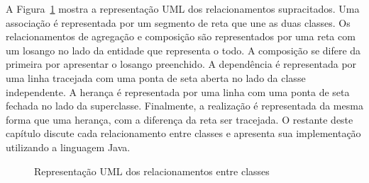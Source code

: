 A Figura~\ref{fig:relacionamentos-uml} mostra a representação UML dos relacionamentos supracitados. Uma associação é representada por um segmento de reta que une as duas classes. Os relacionamentos de agregação e composição são representados por uma reta com um losango no lado da entidade que representa o todo. A composição se difere da primeira por apresentar o losango preenchido. A dependência é representada por uma linha tracejada com uma ponta de seta aberta no lado da classe independente. A herança é representada por uma linha com uma ponta de seta fechada no lado da superclasse. Finalmente, a realização é representada da mesma forma que uma herança, com a diferença da reta ser tracejada. O restante deste capítulo discute cada relacionamento entre classes e apresenta sua implementação utilizando a linguagem Java.

\begin{figure}[h]
	\centering
	\caption{Representação UML dos relacionamentos entre classes}
	\label{fig:relacionamentos-uml}
\end{figure}